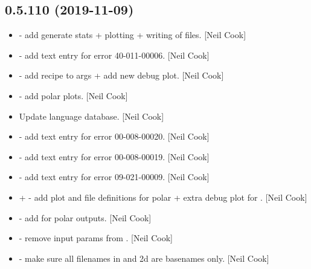\documentclass[a4paper,10pt,english]{report}
\begin{document}
\subsection{0.5.110 (2019-11-09)}
\label{\detokenize{misc/changelog:id32}}\begin{itemize}
\item {} 
 - add generate stats + plotting + writing of files.
{[}Neil Cook{]}

\item {} 
 - add text entry for error 40-011-00006. {[}Neil
Cook{]}

\item {} 
 - add recipe to args + add new debug
plot. {[}Neil Cook{]}

\item {} 
 - add polar plots. {[}Neil Cook{]}

\item {} 
Update language database. {[}Neil Cook{]}

\item {} 
 - add text entry for error 00-008-00020. {[}Neil Cook{]}

\item {} 
 - add text entry for error 00-008-00019. {[}Neil Cook{]}

\item {} 
 - add text entry for error 09-021-00009. {[}Neil Cook{]}

\item {} 
 +  -
add plot and file definitions for polar + extra debug plot for
. {[}Neil Cook{]}

\item {} 
 - add  for polar outputs.
{[}Neil Cook{]}

\item {} 
 - remove input params from
. {[}Neil Cook{]}

\item {} 
 - make sure all filenames in  and 2d
are basenames only. {[}Neil Cook{]}


\end{itemize}
\end{document}
